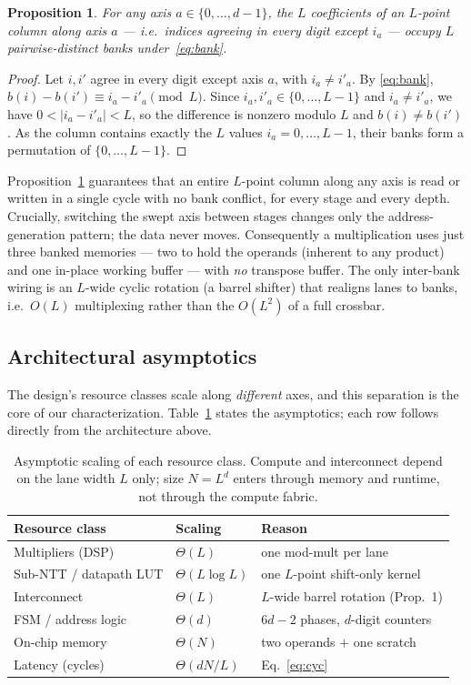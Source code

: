 \documentclass[conference]{IEEEtran}
\newtheorem{proposition}{Proposition}
\begin{document}
\begin{proposition}\label{prop:cf}
For any axis $a\in\{0,\dots,d-1\}$, the $L$ coefficients of an $L$-point column
along axis $a$ --- i.e.\ indices agreeing in every digit except $i_a$ --- occupy
$L$ pairwise-distinct banks under~\eqref{eq:bank}.
\end{proposition}
\begin{proof}
Let $i,i'$ agree in every digit except axis $a$, with $i_a\neq i'_a$. By
\eqref{eq:bank}, $b(i)-b(i')\equiv i_a-i'_a \pmod L$. Since
$i_a,i'_a\in\{0,\dots,L-1\}$ and $i_a\neq i'_a$, we have $0<|i_a-i'_a|<L$, so the
difference is nonzero modulo $L$ and $b(i)\neq b(i')$. As the column contains
exactly the $L$ values $i_a=0,\dots,L-1$, their banks form a permutation of
$\{0,\dots,L-1\}$.
\end{proof}

Proposition~\ref{prop:cf} guarantees that an entire $L$-point column along any
axis is read or written in a single cycle with no bank conflict, for every
stage and every depth.
Crucially, switching the swept axis between stages changes only the
address-generation pattern; the data never moves. Consequently a multiplication
uses just three banked memories --- two to hold the operands (inherent to any
product) and one in-place working buffer --- with \emph{no} transpose buffer. The
only inter-bank wiring is an $L$-wide cyclic rotation (a barrel shifter) that
realigns lanes to banks, i.e.\ $O(L)$ multiplexing rather than the $O(L^{2})$ of a
full crossbar.

\subsection{Architectural asymptotics}\label{sec:asymp}
The design's resource classes scale along \emph{different} axes, and this
separation is the core of our characterization. Table~\ref{tab:asymp} states the
asymptotics; each row follows directly from the architecture above.

\begin{table}[t]
\centering
\caption{Asymptotic scaling of each resource class. Compute and interconnect
depend on the lane width $L$ only; size $N=L^{d}$ enters through memory and
runtime, not through the compute fabric.}
\label{tab:asymp}
\footnotesize
\begin{tabular}{lll}
\toprule
Resource class & Scaling & Reason\\
\midrule
Multipliers (DSP)      & $\Theta(L)$    & one mod-mult per lane\\
Sub-NTT / datapath LUT & $\Theta(L\log L)$ & one $L$-point shift-only kernel\\
Interconnect           & $\Theta(L)$    & $L$-wide barrel rotation (Prop.~1)\\
FSM / address logic    & $\Theta(d)$    & $6d-2$ phases, $d$-digit counters\\
On-chip memory         & $\Theta(N)$    & two operands $+$ one scratch\\
Latency (cycles)       & $\Theta(dN/L)$ & Eq.~\eqref{eq:cyc}\\
\bottomrule
\end{tabular}
\end{table}
\end{document}
